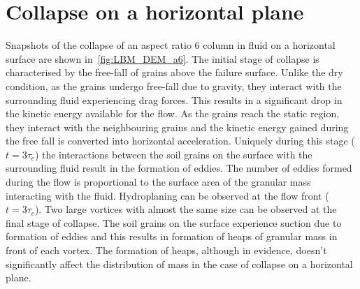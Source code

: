 \documentclass[epj,twocolumn]{webofc}
\begin{document}
\section{Collapse on a horizontal plane}
Snapshots of the collapse of an aspect ratio 6 column in fluid on a horizontal 
surface are shown in~\cref{fig:LBM_DEM_a6}. The initial stage of collapse is 
characterised by the free-fall of grains above the failure surface. Unlike the 
dry condition, as the grains undergo free-fall due to gravity, they interact 
with the surrounding fluid experiencing drag forces. This results in a 
significant drop in the kinetic energy available for the flow. As the grains 
reach the static region, they interact with the neighbouring grains and the 
kinetic energy gained during the free fall is converted into horizontal 
acceleration. Uniquely during this stage ($t = 3\tau_c$) the interactions 
between the soil grains on the surface with the surrounding fluid result in the 
formation of eddies. The number of eddies formed during the flow is 
proportional to the surface area of the granular mass interacting with the 
fluid. Hydroplaning can be observed at the flow front ($t = 3\tau_c$). Two 
large vortices with almost the same size can be observed at the final stage of 
collapse. The soil grains on the surface experience suction due to formation of 
eddies and this results in formation of heaps of granular mass in front of each 
vortex. The formation of heaps, although in evidence, doesn't significantly 
affect the distribution of mass in the case of collapse on a horizontal plane. 
\end{document}
